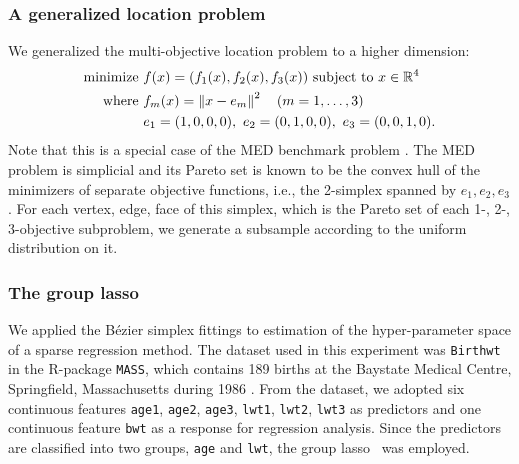 \documentclass{article}
\begin{document}
\subsubsection{A generalized location problem}\label{sec:location-problem}
We generalized the multi-objective location problem \cite{Kuhn1967} to a higher dimension:
\begin{equation}
\begin{split}
\text{minimize } & f(x) = (f_1(x), f_2(x), f_3(x)) \text{ subject to }x \in \mathbb{R}^4\\
\text{where }    & f_m(x) = \left\| x - e_m \right\|^2 \quad (m = 1, \dots, 3)\\
                 & e_1 = (1,0,0,0),\ e_2 = (0,1,0,0),\ e_3 = (0,0,1,0).
\end{split}
\end{equation}
Note that this is a special case of the MED benchmark problem \cite{Hamada2010}.
The MED problem is simplicial \cite{Hamada2017} and its Pareto set is known to be the convex hull of the minimizers of separate objective functions, i.e., the 2-simplex spanned by $e_1, e_2, e_3$.
For each vertex, edge, face of this simplex, which is the Pareto set of each 1-, 2-, 3-objective subproblem, we generate a subsample according to the uniform distribution on it.

\subsubsection{The group lasso}\label{sec:group-lasso}
We applied the B\'ezier simplex fittings to estimation of the hyper-parameter space of a sparse regression method.
The dataset used in this experiment was \texttt{Birthwt} in the R-package \texttt{MASS}, which contains 189 births at the Baystate Medical Centre, Springfield, Massachusetts during 1986 \cite{Hosmer1989,Venables2002}.
From the dataset, we adopted six continuous features \texttt{age1}, \texttt{age2}, \texttt{age3}, \texttt{lwt1}, \texttt{lwt2}, \texttt{lwt3} as predictors and one continuous feature \texttt{bwt} as a response for regression analysis.
Since the predictors are classified into two groups, \texttt{age} and \texttt{lwt}, the group lasso~\cite{Yuan2006} was employed.
\end{document}
